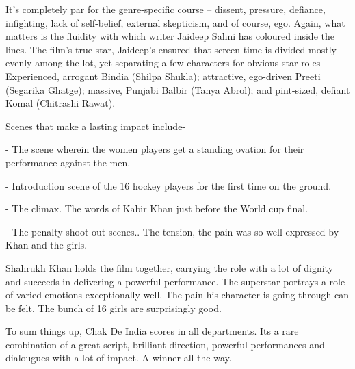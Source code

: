 \documentclass[11pt]{article} %
\begin{document}
It's completely par for the genre-specific course -- dissent, pressure, defiance, infighting, lack of self-belief, external skepticism, and of course, ego. Again, what matters is the fluidity with which writer Jaideep Sahni has coloured inside the lines. The film's true star, Jaideep's ensured that screen-time is divided mostly evenly among the lot, yet separating a few characters for obvious star roles -- Experienced, arrogant Bindia (Shilpa Shukla); attractive, ego-driven Preeti (Segarika Ghatge); massive, Punjabi Balbir (Tanya Abrol); and pint-sized, defiant Komal (Chitrashi Rawat).

Scenes that make a lasting impact include-

- The scene wherein the women players get a standing ovation for their performance against the men.

- Introduction scene of the 16 hockey players for the first time on the ground.

- The climax. The words of Kabir Khan just before the World cup final.

- The penalty shoot out scenes.. The tension, the pain was so well expressed by Khan and the girls.

Shahrukh Khan holds the film together, carrying the role with a lot of dignity and succeeds in delivering a powerful performance. The superstar portrays a role of varied emotions exceptionally well. The pain his character is going through can be felt. The bunch of 16 girls are surprisingly good.

To sum things up, Chak De India scores in all departments. Its a rare combination of a great script, brilliant direction, powerful performances and dialougues with a lot of impact. A winner all the way.
\end{document}
